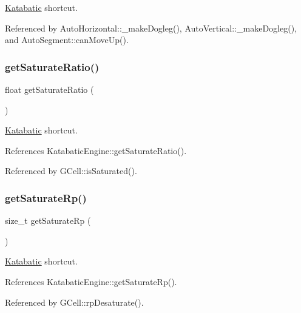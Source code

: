 \mbox{\hyperlink{namespaceKatabatic}{Katabatic}} shortcut. 

Referenced by Auto\+Horizontal\+::\+\_\+make\+Dogleg(), Auto\+Vertical\+::\+\_\+make\+Dogleg(), and Auto\+Segment\+::can\+Move\+Up().

\mbox{\label{classKatabatic_1_1Session_a266a4079ca235e8fdb622ef4996d324d}} 
\subsubsection{\texorpdfstring{get\+Saturate\+Ratio()}{getSaturateRatio()}}
{\footnotesize\ttfamily float get\+Saturate\+Ratio (\begin{DoxyParamCaption}{ }\end{DoxyParamCaption})\hspace{0.3cm}{\ttfamily [static]}}

\mbox{\hyperlink{namespaceKatabatic}{Katabatic}} shortcut. 

References Katabatic\+Engine\+::get\+Saturate\+Ratio().



Referenced by G\+Cell\+::is\+Saturated().

\mbox{\label{classKatabatic_1_1Session_adfdaa8b3e81de14fce1f99444b35fcda}} 
\subsubsection{\texorpdfstring{get\+Saturate\+Rp()}{getSaturateRp()}}
{\footnotesize\ttfamily size\+\_\+t get\+Saturate\+Rp (\begin{DoxyParamCaption}{ }\end{DoxyParamCaption})\hspace{0.3cm}{\ttfamily [static]}}

\mbox{\hyperlink{namespaceKatabatic}{Katabatic}} shortcut. 

References Katabatic\+Engine\+::get\+Saturate\+Rp().



Referenced by G\+Cell\+::rp\+Desaturate().


